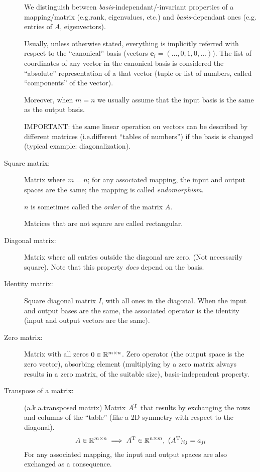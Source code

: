 \documentclass[
  12pt,
  paper=a4,
]{scrartcl} %
\begin{document}
\begin{description}
We distinguish between \emph{basis}-independant/-invariant properties of a mapping/matrix (e.g.\@ rank, eigenvalues, etc.) and  \emph{basis}-dependant ones (e.g. entries of $A$, eigenvectors).

Usually, unless otherwise stated, everything is implicitly referred with respect to the ``canonical'' basis (vectors $\bm e_i = (..., 0 , 1, 0, ...)$). The list of coordinates of any vector in the canonical basis is considered the ``absolute'' representation of a that vector (tuple or list of numbers, called ``components'' of the vector).

Moreover, when $m=n$ we usually assume that the input basis is the same as the output basis.

IMPORTANT: the same linear operation on vectors can be described by different matrices (i.e.\@ different ``tables of numbers'') if the basis is changed (typical example: diagonalization).

\item[Square matrix:] Matrix where $m=n$; for any associated mapping, the input and output spaces are the same; the mapping is called \emph{endomorphism}.

$n$ is sometimes called the \emph{order} of the matrix $A$.

Matrices that are not square are called rectangular.

\item[Diagonal matrix:] Matrix where all entries outside the diagonal are zero. (Not necessarily square). Note that this property \emph{does} depend on the basis.

\item[Identity matrix:] Square diagonal matrix $I$, with all ones in the diagonal. When the input and output bases are the same, the associated operator is the identity (input and output vectors are the same).

\item[Zero matrix:] Matrix with all zeros $0\in\mathbb R^{m\times n}$. Zero operator (the output space is the zero vector), absorbing element (multiplying by a zero matrix always results in a zero matrix, of the suitable size), basis-independent property.

\item[Transpose of a matrix:] (a.k.a.\@ transposed matrix) Matrix $A^{\mathrm{T}}$ that results by exchanging the rows and columns of the ``table'' (like a 2D symmetry with respect to the diagonal).
\[
A\in\mathbb R^{m\times n} \implies A^{\mathrm{T}}\in \mathbb R^{n\times m},\,\,
(A^{\mathrm{T}})_{ij} = a_{ji}
\]
For any associated mapping, the input and output spaces are also exchanged as a consequence.


\end{description}
\end{document}
